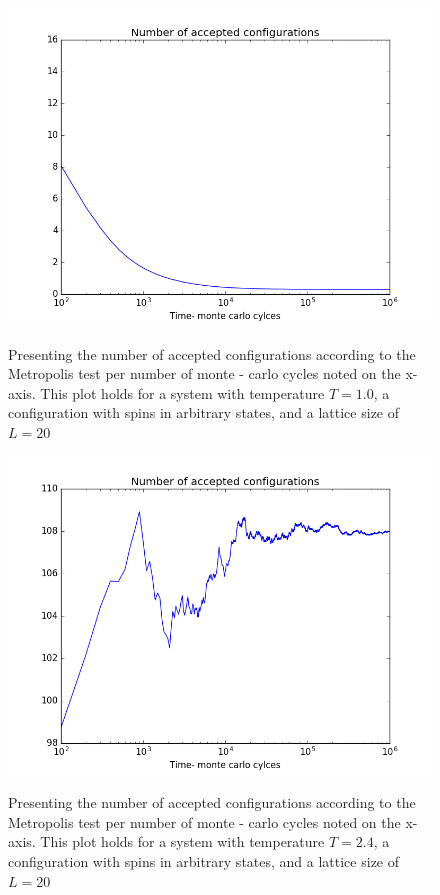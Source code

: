\documentclass[12pt]{article}
\begin{document}
\noindent 
\begin{figure}[H]
\includegraphics[scale=0.6]{accept_config_1.png}\label{fig:accept_config_1}
\caption{Presenting the number of accepted configurations according to the Metropolis test per number of monte - carlo cycles noted on the x-axis. This plot holds for a system with temperature $T = 1.0$, a configuration with spins in arbitrary states, and a lattice size of $L = 20 $}
\end{figure}

\begin{figure}[H]
\includegraphics[scale=0.6]{accept_config.png}\label{fig:accept_config}
\caption{Presenting the number of accepted configurations according to the Metropolis test per number of monte - carlo cycles noted on the x-axis. This plot holds for a system with temperature $T = 2.4$, a configuration with spins in arbitrary states, and a lattice size of $L = 20 $}
\end{figure}
\end{document}
